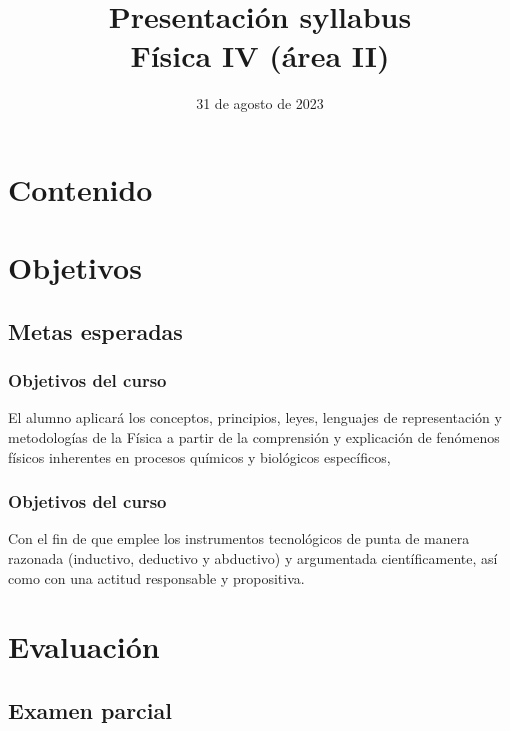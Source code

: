 \documentclass[14pt]{beamer}
\title{\Large{Presentación syllabus} \\ \normalsize{Física IV (área II)}}
\date{31 de agosto de 2023}
\begin{document}
\maketitle

\section*{Contenido}

\section{Objetivos}
\subsection{Metas esperadas}

\begin{frame}
\frametitle{Objetivos del curso}
El alumno aplicará los conceptos, principios, leyes, lenguajes de representación y metodologías de la Física a partir de la comprensión y explicación de fenómenos físicos inherentes en procesos químicos y biológicos específicos, 
\end{frame}
\begin{frame}
\frametitle{Objetivos del curso}
Con el fin de que emplee los instrumentos tecnológicos de punta de manera razonada (inductivo, deductivo y abductivo) y argumentada científicamente, así como con una actitud responsable y propositiva.
\end{frame}

\section{Evaluación}
\subsection{Examen parcial}
\end{document}
